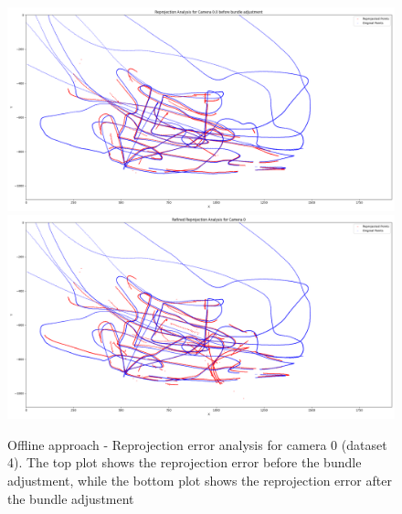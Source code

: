 \documentclass[11pt]{article}
\begin{document}
\begin{figure}[h]
    \centering
    \includegraphics[width=\textwidth]{../plots/dataset4/reprojection_analysis_camera_0_before_ba_.png}
    \includegraphics[width=\textwidth]{../plots/dataset4/reprojection_analysis_camera_0.png}
    \caption{Offline approach - Reprojection error analysis for camera 0 (dataset 4). The top plot shows the reprojection error before the bundle adjustment, while the bottom plot shows the reprojection error after the bundle adjustment}
    \label{fig:reprojection_analysis}
\end{figure}
\end{document}
